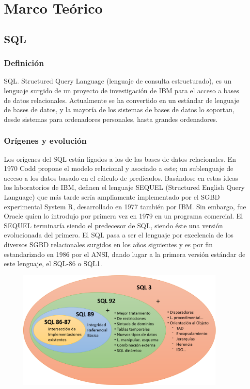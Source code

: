\documentclass[preprint,12pt]{elsarticle}
\begin{document}
\section{Marco Teórico}
\subsection {\textbf{SQL}}

\subsubsection{\textbf{Definición}}
SQL. Structured Query Language (lenguaje de consulta estructurado), es un lenguaje surgido de un proyecto de investigación de IBM para el acceso a bases de datos relacionales. Actualmente se ha convertido en un estándar de lenguaje de bases de datos, y la mayoría de los sistemas de bases de datos lo soportan, desde sistemas para ordenadores personales, hasta grandes ordenadores. \cite{SQLne}

\subsubsection{\textbf{Orígenes y evolución}}
Los orígenes del SQL están ligados a los de las bases de datos relacionales. En 1970 Codd propone el modelo relacional y asociado a este; un sublenguaje de acceso a los datos basado en el cálculo de predicados. Basándose en estas ideas los laboratorios de IBM, definen el lenguaje SEQUEL (Structured English Query Language) que más tarde sería ampliamente implementado por el SGBD experimental System R, desarrollado en 1977 también por IBM. Sin embargo, fue Oracle quien lo introdujo por primera vez en 1979 en un programa comercial. El SEQUEL terminaría siendo el predecesor de SQL, siendo éste una versión evolucionada del primero. El SQL pasa a ser el lenguaje por excelencia de los diversos SGBD relacionales surgidos en los años siguientes y es por fin estandarizado en 1986 por el ANSI, dando lugar a la primera versión estándar de este lenguaje, el SQL-86 o SQL1. 

\begin{figure}[htb]
	\begin{center}
		\includegraphics[width=10.5cm]{./IMAGENES/evolucion}
	\end{center}
\end{figure}
\end{document}
